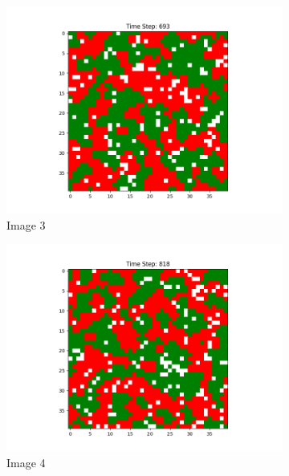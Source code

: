 \documentclass[12pt]{article}
\begin{document}
\begin{figure}[h]
\begin{subfigure}{0.2\textwidth}
			\includegraphics[width=\linewidth]{final_cluster_w20b10.png}
			\caption{Image 3}
		\end{subfigure}\hspace{0.02\textwidth}
		\begin{subfigure}{0.2\textwidth}
			\includegraphics[width=\linewidth]{final_cluster_w5b20.png}
			\caption{Image 4}
		\end{subfigure}\hspace{0.02\textwidth}
		\begin{subfigure}{0.2\textwidth}

\end{subfigure}
\end{figure}
\end{document}
